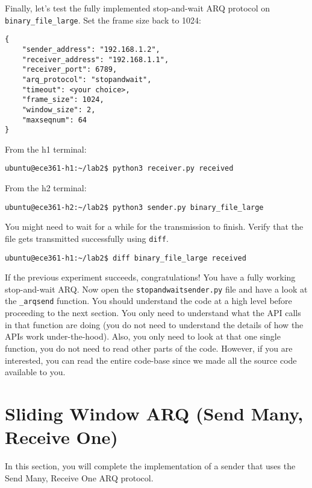 \documentclass[11pt]{article}
\begin{document}
Finally, let's test the fully implemented stop-and-wait ARQ protocol on \texttt{binary\_file\_large}. Set the frame size back to 1024:
\begin{lstlisting}[style=ece361-shell-base, caption={Configuration For Large File}]
{
    "sender_address": "192.168.1.2",
    "receiver_address": "192.168.1.1",
    "receiver_port": 6789,
    "arq_protocol": "stopandwait",
    "timeout": <your choice>,
    "frame_size": 1024,
    "window_size": 2,
    "maxseqnum": 64
}
\end{lstlisting}

From the h1 terminal:
\begin{lstlisting}[style=ece361-shell-base, caption={}]
ubuntu@ece361-h1:~/lab2$ python3 receiver.py received
\end{lstlisting}

From the h2 terminal:
\begin{lstlisting}[style=ece361-shell-base, caption={}]
ubuntu@ece361-h2:~/lab2$ python3 sender.py binary_file_large
\end{lstlisting}

\noindent You might need to wait for a while for the transmission to finish. Verify that the file gets transmitted successfully using \texttt{diff}.
\begin{lstlisting}[style=ece361-shell-base, caption={}]
ubuntu@ece361-h1:~/lab2$ diff binary_file_large received
\end{lstlisting}

If the previous experiment succeeds, congratulations! You have a fully working stop-and-wait ARQ.
Now open the \texttt{stopandwaitsender.py} file and have a look at the \texttt{\_arqsend} function.
You should understand the code at a high level before proceeding to the next section. You only need to understand what the API calls in that function are doing (you do not need to understand the details of how the APIs work under-the-hood).
Also, you only need to look at that one single function, you do not need to read other parts of the code.
However, if you are interested, you can read the entire code-base since we made all the source code available to you.

\section{Sliding Window ARQ (Send Many, Receive One)}
\label{sec:sliding}
In this section, you will complete the implementation of a sender that uses the Send Many, Receive One ARQ protocol.
\end{document}

